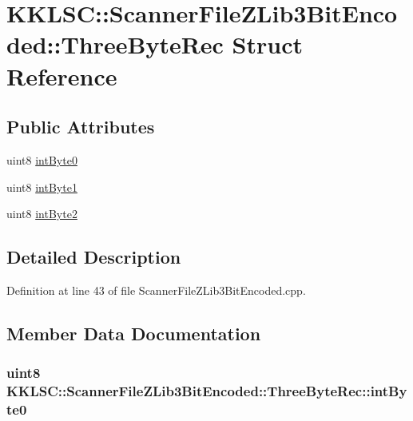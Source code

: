 \hypertarget{struct_scanner_file_z_lib3_bit_encoded_1_1_three_byte_rec}{}\section{K\+K\+L\+SC\+:\+:Scanner\+File\+Z\+Lib3\+Bit\+Encoded\+:\+:Three\+Byte\+Rec Struct Reference}
\label{struct_scanner_file_z_lib3_bit_encoded_1_1_three_byte_rec}
\subsection*{Public Attributes}
\begin{DoxyCompactItemize}
\item 
uint8 \hyperlink{struct_scanner_file_z_lib3_bit_encoded_1_1_three_byte_rec_a84d0925c968995056b307bdbe227bf4f}{int\+Byte0}
\item 
uint8 \hyperlink{struct_scanner_file_z_lib3_bit_encoded_1_1_three_byte_rec_a139e021b8cd18a8f472e72f221ab16c9}{int\+Byte1}
\item 
uint8 \hyperlink{struct_scanner_file_z_lib3_bit_encoded_1_1_three_byte_rec_a560d7834042684c35d5c21cdcf52f0ad}{int\+Byte2}
\end{DoxyCompactItemize}


\subsection{Detailed Description}


Definition at line 43 of file Scanner\+File\+Z\+Lib3\+Bit\+Encoded.\+cpp.



\subsection{Member Data Documentation}
\subsubsection[{\texorpdfstring{int\+Byte0}{intByte0}}]{\setlength{\rightskip}{0pt plus 5cm}uint8 K\+K\+L\+S\+C\+::\+Scanner\+File\+Z\+Lib3\+Bit\+Encoded\+::\+Three\+Byte\+Rec\+::int\+Byte0}\hypertarget{struct_scanner_file_z_lib3_bit_encoded_1_1_three_byte_rec_a84d0925c968995056b307bdbe227bf4f}{}\label{struct_scanner_file_z_lib3_bit_encoded_1_1_three_byte_rec_a84d0925c968995056b307bdbe227bf4f}


